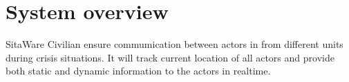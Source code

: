\section{System overview}

SitaWare Civilian ensure commumication between actors in from different units during crisis situations. It will track current location of all actors and provide both static and dynamic information to the actors in realtime.